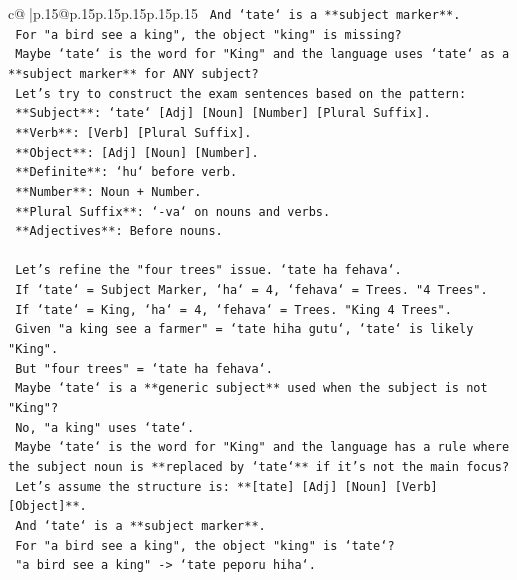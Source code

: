\documentclass{article}
\begin{document}
{\begin{supertabular}{c@{$\;$}|p{.15\linewidth}@{}p{.15\linewidth}p{.15\linewidth}p{.15\linewidth}p{.15\linewidth}p{.15\linewidth}}
{{{\texttt{    And `tate` is a **subject marker**.} \\
\texttt{    For "a bird see a king", the object "king" is missing?} \\
\texttt{    Maybe `tate` is the word for "King" and the language uses `tate` as a **subject marker** for ANY subject?} \\
\texttt{    Let's try to construct the exam sentences based on the pattern:} \\
\texttt{    **Subject**: `tate` {[}Adj{]} {[}Noun{]} {[}Number{]} {[}Plural Suffix{]}.} \\
\texttt{    **Verb**: {[}Verb{]} {[}Plural Suffix{]}.} \\
\texttt{    **Object**: {[}Adj{]} {[}Noun{]} {[}Number{]}.} \\
\texttt{    **Definite**: `hu` before verb.} \\
\texttt{    **Number**: Noun + Number.} \\
\texttt{    **Plural Suffix**: `{-}va` on nouns and verbs.} \\
\texttt{    **Adjectives**: Before nouns.} \\
\\ 
\texttt{    Let's refine the "four trees" issue. `tate ha fehava`.} \\
\texttt{    If `tate` = Subject Marker, `ha` = 4, `fehava` = Trees. "4 Trees".} \\
\texttt{    If `tate` = King, `ha` = 4, `fehava` = Trees. "King 4 Trees".} \\
\texttt{    Given "a king see a farmer" = `tate hiha gutu`, `tate` is likely "King".} \\
\texttt{    But "four trees" = `tate ha fehava`.} \\
\texttt{    Maybe `tate` is a **generic subject** used when the subject is not "King"?} \\
\texttt{    No, "a king" uses `tate`.} \\
\texttt{    Maybe `tate` is the word for "King" and the language has a rule where the subject noun is **replaced by `tate`** if it's not the main focus?} \\
\texttt{    Let's assume the structure is: **{[}tate{]} {[}Adj{]} {[}Noun{]} {[}Verb{]} {[}Object{]}**.} \\
\texttt{    And `tate` is a **subject marker**.} \\
\texttt{    For "a bird see a king", the object "king" is `tate`?} \\
\texttt{    "a bird see a king" {-}> `tate peporu hiha`.} \\
}}}
\end{supertabular}}
\end{document}
